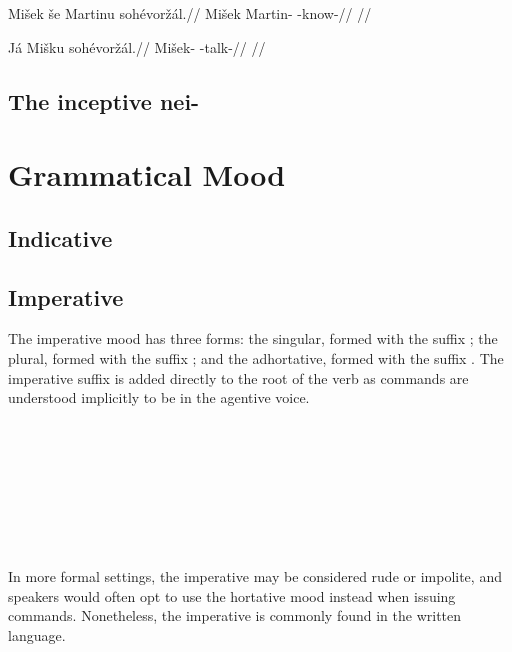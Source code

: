 \pex
\begingl
\gla Mi\v{s}ek \v{s}e Martinu soh\'evor\v{z}\'al.//
\glb Mi\v{s}ek  Martin- -know-//
\glft {}//
\endgl
\xe

\pex
\begingl
\gla J\'a Mi\v{s}ku soh\'evor\v{z}\'al.//
\glb {} Mi\v{s}ek- -talk-//
\glft {}//
\endgl
\xe

\subsection{The inceptive nei-}
\section{Grammatical Mood}

\subsection{Indicative}

\subsection{Imperative}
The imperative mood has three forms: the singular, formed with the suffix ; the plural, formed with the suffix ; and the adhortative, formed with the suffix . The imperative suffix is added directly to the root of the verb as commands are understood implicitly to be in the agentive voice.

\ex
{} \\
	\\
 \\
 
\xe

\ex
{} \\
	\\
 \\
 
\xe

\medskip

In more formal settings, the imperative may be considered rude or impolite, and speakers would often opt to use the hortative mood instead when issuing commands. Nonetheless, the imperative is commonly found in the written language. 

